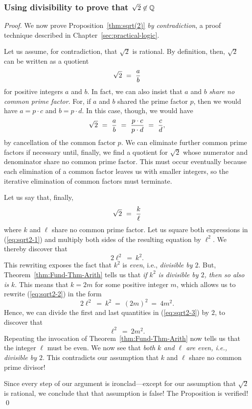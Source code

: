 \subsubsection{Using divisibility to prove that $\sqrt{2} \not\in \mathbb{Q}$}
\label{sec:classical-proof-sqrt(2)}

\begin{proof}
We now prove Proposition~\ref{thm:sqrt(2)} {\em by
contradiction}, a proof technique
described in Chapter~\ref{sec:practical-logic}.

Let us assume, for contradiction, that $\sqrt{2}$ is rational.  By
definition, then, $\sqrt{2}$ can be written as a quotient
\[ \sqrt{2} \ = \ {a \over b} \]
for positive integers $a$ and $b$.  In fact, we can also insist that
$a$ and $b$ {\em share no common prime factor}.  For, if $a$ and $b$
shared the prime factor $p$, then we would have $a = p \cdot c$ and
$b = p \cdot d$.  In this case, though, we would have
\[ \sqrt{2} \ = \ {a \over b} \ = \ \frac{p \cdot c}{p \cdot d}
\ = \ {c \over d},
\]
by cancellation of the common factor $p$.  We can eliminate further
common prime factors if necessary until, finally, we find a quotient
for $\sqrt{2}$ whose numerator and denominator share no common prime
factor.  This must occur eventually because each elimination of a
common factor leaves us with smaller integers, so the iterative
elimination of common factors must terminate.

Let us say that, finally,
\begin{equation}
\label{eq:sqrt2-1}
\sqrt{2} \ = \ {k \over \ell}
\end{equation}
where $k$ and $\ell$ share no common prime factor.  Let us square both
expressions in (\ref{eq:sqrt2-1}) and multiply both sides of the
resulting equation by $\ell^2$.  We thereby discover that
\begin{equation}
\label{eq:sqrt2-2}
2 \ell^2 \ = \ k^2.
\end{equation}
This rewriting exposes the fact that $k^2$ is {\em even},
i.e., {\em divisible by $2$}.  But, Theorem~\ref{thm:Fund-Thm-Arith}
tells us that {\em if $k^2$ is divisible by $2$, then so also is $k$}.
This means that $k = 2m$ for some positive integer $m$, which allows
us to rewrite (\ref{eq:sqrt2-2}) in the form
\begin{equation}
\label{eq:sqrt2-3}
2 \ell^2 \ = \ k^2 \ = \ (2m)^2 \ = \ 4m^2.
\end{equation}
Hence, we can divide the first and last quantities in
(\ref{eq:sqrt2-3}) by $2$, to discover that
\[ \ell^2 \ = \ 2m^2. \]
Repeating the invocation of Theorem~\ref{thm:Fund-Thm-Arith} now tells
us that the integer $\ell$ must be even.  We now see that {\em both
  $k$ and $\ell$ are even, i.e., divisible by $2$}.  This contradicts
our assumption that $k$ and $\ell$ share no common prime divisor!

Since every step of our argument is ironclad---except for our
assumption that $\sqrt{2}$ is rational, we conclude that that
assumption is false!  The Proposition is verified!  \qed
\end{proof}
\medskip

